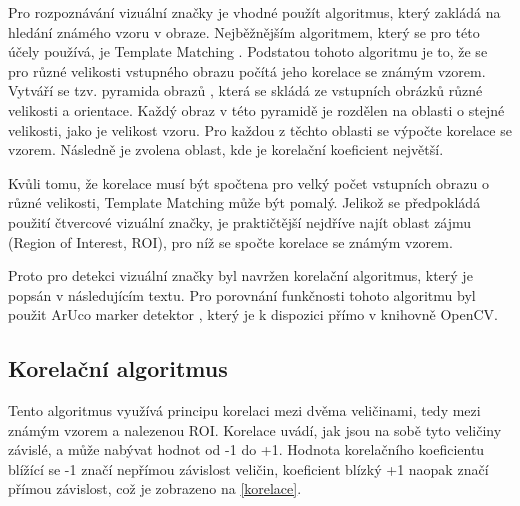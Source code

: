 \documentclass[twoside]{ctuthesis}
\theoremstyle{plain}
\theoremstyle{definition}
\theoremstyle{note}
\begin{document}
Pro rozpoznávání vizuální značky je vhodné použít algoritmus, který zakládá na hledání známého vzoru v obraze. Nejběžnějším algoritmem, který se pro této účely používá, je Template Matching \cite{cite:16}. Podstatou tohoto algoritmu je to, že se pro různé velikosti vstupného obrazu počítá jeho korelace se známým vzorem. Vytváří se tzv. pyramida obrazů \cite{cite:17}, která se skládá ze vstupních obrázků různé velikosti a orientace. Každý obraz v této pyramidě je rozdělen na oblasti o stejné velikosti, jako je velikost vzoru. Pro každou z těchto oblasti se výpočte korelace se vzorem. Následně je zvolena oblast, kde je korelační koeficient největší.

Kvůli tomu, že korelace musí být spočtena pro velký počet vstupních obrazu o různé velikosti, Template Matching může být pomalý. Jelikož se předpokládá použití čtvercové vizuální značky, je praktičtější nejdříve najít oblast zájmu (Region of Interest, ROI), pro níž se spočte korelace se známým vzorem.

Proto pro detekci vizuální značky byl navržen korelační algoritmus, který je popsán v následujícím textu. Pro porovnání funkčnosti tohoto algoritmu byl použit ArUco marker detektor  \cite{cite:7}, který je k dispozici přímo v knihovně OpenCV.

\subsection{Korelační algoritmus}

Tento algoritmus využívá principu korelaci mezi dvěma veličinami, tedy mezi známým vzorem a nalezenou ROI. Korelace uvádí, jak jsou na sobě tyto veličiny závislé, a může nabývat hodnot od -1 do +1. Hodnota korelačního koeficientu blížící se -1 značí nepřímou závislost veličin, koeficient blízký +1 naopak značí přímou závislost, což je zobrazeno na \ref{korelace}.
\end{document}

